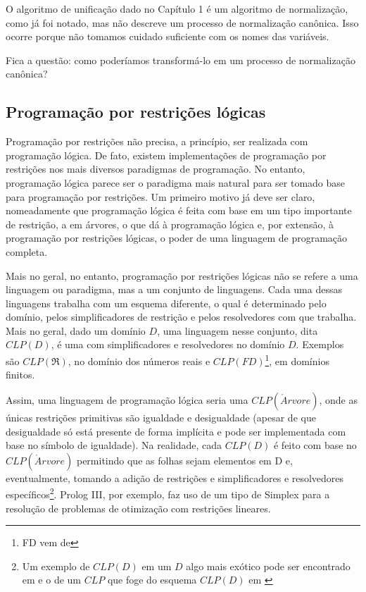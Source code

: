 \documentclass{article}
\begin{document}
  O algoritmo de unificação dado no Capítulo 1 %
é um algoritmo de normalização, como já foi notado, mas não descreve um processo de normalização canônica. Isso ocorre porque não tomamos cuidado suficiente com os nomes das variáveis.

Fica a questão: como poderíamos transformá-lo em um processo de normalização canônica?

\subsection{Programação por restrições lógicas}

Programação por restrições não precisa, a princípio, ser realizada com programação lógica. De fato, existem implementações de
programação por restrições nos mais diversos paradigmas de programação. No entanto, programação lógica parece ser o paradigma mais natural
para ser tomado base para programação por restrições. Um primeiro motivo já deve ser claro, nomeadamente que programação lógica é feita com base em um tipo importante de restrição, a em árvores, o que dá à programação lógica e, por extensão, à programação
por restrições lógicas, o poder de uma linguagem de programação completa.

Mais no geral, no entanto, programação por restrições lógicas não se refere a uma linguagem ou paradigma, mas a um conjunto
de linguagens. Cada uma dessas linguagens trabalha com um esquema diferente, o qual é determinado pelo domínio,
pelos simplificadores de restrição e pelos resolvedores com que trabalha. Mais no geral, dado um domínio $D$,
uma linguagem nesse conjunto, dita $CLP(D)$, é uma com simplificadores e resolvedores no domínio $D$.
Exemplos são $CLP(\Re)$, no domínio dos números reais e $CLP(FD)$\footnote{FD vem de }, em domínios finitos.

Assim, uma linguagem de programação lógica  seria uma $CLP(\acute{A}rvore)$, onde as únicas restrições primitivas são igualdade e desigualdade (apesar de que desigualdade só está presente de forma implícita e pode ser implementada com base no símbolo de igualdade).
Na realidade, cada $CLP(D)$ é feito com base no $CLP(\acute{A}rvore)$ permitindo que as folhas sejam elementos em D e, eventualmente, tomando a adição de restrições e simplificadores e resolvedores específicos\footnote{Um exemplo de $CLP(D)$ em um $D$ algo mais exótico pode ser encontrado em \cite{besik} e o de um $CLP$ que foge do esquema $CLP(D)$ em \cite{margarida}}. Prolog III, por exemplo, faz uso de um tipo de Simplex para a resolução
de problemas de otimização com restrições lineares.
\end{document}
